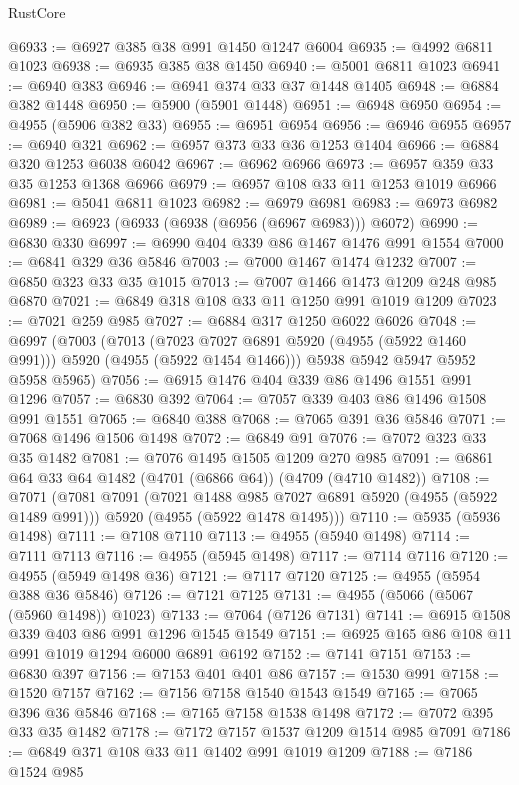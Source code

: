 \begin{lexlean}{RustCore}
\begin{coremodule}
@6933 := @6927 @385 @38 @991 @1450 @1247 @6004
@6935 := @4992 @6811 @1023
@6938 := @6935 @385 @38 @1450
@6940 := @5001 @6811 @1023
@6941 := @6940 @383
@6946 := @6941 @374 @33 @37 @1448 @1405
@6948 := @6884 @382 @1448
@6950 := @5900 (@5901 @1448)
@6951 := @6948 @6950
@6954 := @4955 (@5906 @382 @33)
@6955 := @6951 @6954
@6956 := @6946 @6955
@6957 := @6940 @321
@6962 := @6957 @373 @33 @36 @1253 @1404
@6966 := @6884 @320 @1253 @6038 @6042
@6967 := @6962 @6966
@6973 := @6957 @359 @33 @35 @1253 @1368 @6966
@6979 := @6957 @108 @33 @11 @1253 @1019 @6966
@6981 := @5041 @6811 @1023
@6982 := @6979 @6981
@6983 := @6973 @6982
@6989 := @6923 (@6933 (@6938 (@6956 (@6967 @6983))) @6072)
@6990 := @6830 @330
@6997 := @6990 @404 @339 @86 @1467 @1476 @991 @1554
@7000 := @6841 @329 @36 @5846
@7003 := @7000 @1467 @1474 @1232
@7007 := @6850 @323 @33 @35 @1015
@7013 := @7007 @1466 @1473 @1209 @248 @985 @6870
@7021 := @6849 @318 @108 @33 @11 @1250 @991 @1019 @1209
@7023 := @7021 @259 @985
@7027 := @6884 @317 @1250 @6022 @6026
@7048 := @6997
    (@7003
      (@7013 (@7023 @7027 @6891 @5920 (@4955 (@5922 @1460 @991))) @5920 (@4955 (@5922 @1454 @1466)))
      @5938
      @5942
      @5947
      @5952
      @5958
      @5965)
@7056 := @6915 @1476 @404 @339 @86 @1496 @1551 @991 @1296
@7057 := @6830 @392
@7064 := @7057 @339 @403 @86 @1496 @1508 @991 @1551
@7065 := @6840 @388
@7068 := @7065 @391 @36 @5846
@7071 := @7068 @1496 @1506 @1498
@7072 := @6849 @91
@7076 := @7072 @323 @33 @35 @1482
@7081 := @7076 @1495 @1505 @1209 @270 @985
@7091 := @6861 @64 @33 @64 @1482 (@4701 (@6866 @64)) (@4709 (@4710 @1482))
@7108 := @7071
    (@7081
      @7091
      (@7021 @1488 @985 @7027 @6891 @5920 (@4955 (@5922 @1489 @991)))
      @5920
      (@4955 (@5922 @1478 @1495)))
@7110 := @5935 (@5936 @1498)
@7111 := @7108 @7110
@7113 := @4955 (@5940 @1498)
@7114 := @7111 @7113
@7116 := @4955 (@5945 @1498)
@7117 := @7114 @7116
@7120 := @4955 (@5949 @1498 @36)
@7121 := @7117 @7120
@7125 := @4955 (@5954 @388 @36 @5846)
@7126 := @7121 @7125
@7131 := @4955 (@5066 (@5067 (@5960 @1498)) @1023)
@7133 := @7064 (@7126 @7131)
@7141 := @6915 @1508 @339 @403 @86 @991 @1296 @1545 @1549
@7151 := @6925 @165 @86 @108 @11 @991 @1019 @1294 @6000 @6891 @6192
@7152 := @7141 @7151
@7153 := @6830 @397
@7156 := @7153 @401 @401 @86
@7157 := @1530 @991
@7158 := @1520 @7157
@7162 := @7156 @7158 @1540 @1543 @1549
@7165 := @7065 @396 @36 @5846
@7168 := @7165 @7158 @1538 @1498
@7172 := @7072 @395 @33 @35 @1482
@7178 := @7172 @7157 @1537 @1209 @1514 @985 @7091
@7186 := @6849 @371 @108 @33 @11 @1402 @991 @1019 @1209
@7188 := @7186 @1524 @985

\end{coremodule}
\end{lexlean}
